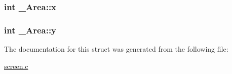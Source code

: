 \subsubsection[{\texorpdfstring{x}{x}}]{\setlength{\rightskip}{0pt plus 5cm}int \+\_\+\+Area\+::x}\hypertarget{struct__Area_a093b8c2929094bac88bbf5ee7db85573}{}\label{struct__Area_a093b8c2929094bac88bbf5ee7db85573}
\subsubsection[{\texorpdfstring{y}{y}}]{\setlength{\rightskip}{0pt plus 5cm}int \+\_\+\+Area\+::y}\hypertarget{struct__Area_a867e601f05480db03237c3a17d4c77f8}{}\label{struct__Area_a867e601f05480db03237c3a17d4c77f8}


The documentation for this struct was generated from the following file\+:\begin{DoxyCompactItemize}
\item 
\hyperlink{screen_8c}{screen.\+c}\end{DoxyCompactItemize}
